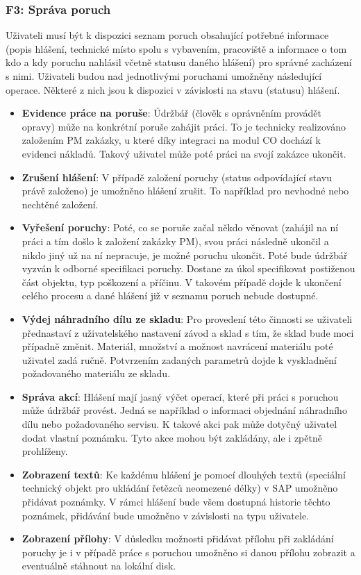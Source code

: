 \documentclass[thesis=M,czech]{FITthesis}[2012/06/26]
\begin{document}
\subsubsection{F3: Správa poruch}
\label{sssec:fc_sprava_poruch}
Uživateli musí být k dispozici seznam poruch obsahující potřebné informace (popis hlášení, technické místo spolu s vybavením, pracoviště a informace o tom kdo a kdy poruchu nahlásil včetně statusu daného hlášení) pro správné zacházení s nimi. Uživateli budou nad jednotlivými poruchami umožněny následující operace. Některé z nich jsou k dispozici v závislosti na stavu (statusu) hlášení.
\begin{itemize}
	\item
	\textbf{Evidence práce na poruše}: Údržbář (člověk s oprávněním provádět opravy) může na konkrétní poruše zahájit práci. To je technicky realizováno založením PM zakázky, u které díky integraci na modul CO dochází k evidenci nákladů. Takový uživatel může poté práci na svojí zakázce ukončit.
	\item
	\textbf{Zrušení hlášení}: V případě založení poruchy (status odpovídající stavu právě založeno) je umožněno hlášení zrušit. To například pro nevhodné nebo nechtěné založení. 
	\item
	\textbf{Vyřešení poruchy}: Poté, co se poruše začal někdo věnovat (zahájil na ní práci a tím došlo k založení zakázky PM), svou práci následně ukončil a nikdo jiný už na ní nepracuje, je možné poruchu ukončit. Poté bude údržbář vyzván k odborné specifikaci poruchy. Dostane za úkol specifikovat postiženou část objektu, typ poškození a příčinu. V takovém případě dojde k ukončení celého procesu a dané hlášení již v seznamu poruch nebude dostupné.
	\item
	\textbf{Výdej náhradního dílu ze skladu}: Pro provedení této činnosti se uživateli přednastaví z uživatelského nastavení závod a sklad s tím, že sklad bude moci případně změnit. Materiál, množství a možnost navrácení materiálu poté uživatel zadá ručně. Potvrzením zadaných parametrů dojde k vyskladnění požadovaného materiálu ze skladu.
	\item
	\textbf{Správa akcí}: Hlášení mají jasný výčet operací, které při práci s poruchou může údržbář provést. Jedná se například o informaci objednání náhradního dílu nebo požadovaného servisu. K takové akci pak může dotyčný uživatel dodat vlastní poznámku. Tyto akce mohou být zakládány, ale i zpětně prohlíženy.
	\item
	\textbf{Zobrazení textů}: Ke každému hlášení je pomocí dlouhých textů (speciální technický objekt pro ukládání řetězců neomezené délky) v SAP umožněno přidávat poznámky. V rámci hlášení bude všem dostupná historie těchto poznámek, přidávání bude umožněno v závislosti na typu uživatele.
	\item
	\textbf{Zobrazení přílohy}: V důsledku možnosti přidávat přílohu při zakládání poruchy je i v případě práce s poruchou umožněno si danou přílohu zobrazit a eventuálně stáhnout na lokální disk.
\end{itemize} 
\end{document}
